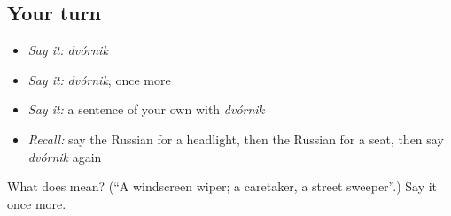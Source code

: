 \subsection*{Your turn}
\begin{itemize}
\raggedright
  \item \emph{Say it:} \emph{dvórnik}
  \item \emph{Say it:} \emph{dvórnik}, once more
  \item \emph{Say it:} a sentence of your own with \emph{dvórnik}
  \item \emph{Recall:} say the Russian for a headlight, then the Russian for a seat, then say \emph{dvórnik} again
\end{itemize}

\begin{tcolorbox}[breakable,colback=teal!4,colframe=teal!35!black,title={Before you move on}]
What does  mean? (\textquotedblleft{}A windscreen wiper; a caretaker, a street sweeper\textquotedblright{}.) Say it once more.
\end{tcolorbox}
